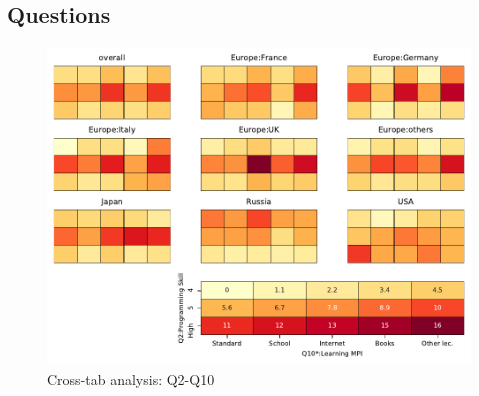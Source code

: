 
\subsection{Questions}


\begin{figure}
\begin{center}
\includegraphics[width=12cm]{../pdfs/Q2-Q10.pdf}
\caption{Cross-tab analysis: Q2-Q10}
\label{fig:Q2-Q10}
\end{center}
\end{figure}
